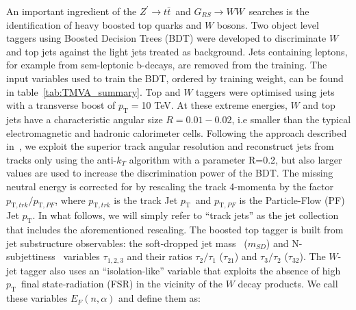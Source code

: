 \documentclass[a4paper,11pt]{article}
\newcommand*{\Zptt}{\ensuremath{Z^{\prime} \rightarrow \ttbar}}
\newcommand{\ptSub}[1]{\ensuremath{p_{\text{T} #1}}}
\newcommand{\ptSup}[1]{\ensuremath{p_{\text{T}}^{#1}}}
\newcommand{\pt}{\ensuremath{p_{\text{T}}}}
\newcommand{\mSD}{\ensuremath{m_{\ensuremath{SD}}}}
\newcommand*{\rsg}{\ensuremath{G_{RS} \rightarrow WW}}
\newcommand*{\ttbar}{\ensuremath{t\bar{t}}}
\begin{document}
An important ingredient of the \Zptt\ and \rsg\ searches is the identification of heavy boosted top quarks and $W$ bosons. Two object level taggers using Boosted Decision Trees (BDT) were developed to discriminate $W$ and top jets against the light jets treated as background. Jets containing leptons, for example from sem-leptonic b-decays, are removed from the training.
The input variables used to train the BDT, ordered by training weight, can be found in table~\ref{tab:TMVA_summary}.
Top and $W$ taggers were optimised using jets with a transverse boost of $\pt=$10 TeV. At these extreme energies, $W$ and top jets have a characteristic angular size $R=0.01-0.02$, i.e smaller than the typical electromagnetic and hadronic calorimeter cells. Following the approach described in~\cite{Larkoski:2015yqa}, we exploit the superior track angular resolution and reconstruct jets from tracks only using the anti-$k_T$ algorithm with a parameter R=0.2, but also larger values are used to increase the discrimination power of the BDT. The missing neutral energy is corrected for by rescaling the track 4-momenta by the factor $\ptSub{,trk}/\ptSub{,PF}$, where $\ptSub{,trk}$ is the track Jet \pt\ and $\ptSub{,PF}$ is the Particle-Flow (PF) Jet \pt. In what follows, we will simply refer to ``track jets'' as the jet collection that includes the aforementioned rescaling.
\newline
The boosted top tagger is built from jet substructure observables: the soft-dropped jet mass~\cite{Larkoski:2014wba} (\mSD) and N-subjettiness~\cite{Thaler:2010tr} variables $\tau_{1,2,3}$ and their ratios $\tau_{2}/\tau_{1}$ ($\tau_{21}$) and $\tau_{3}/\tau_{2}$ ($\tau_{32}$). The $W$-jet tagger also uses an ``isolation-like'' variable that exploits the absence of high \pt\ final state-radiation (FSR) in the vicinity of the $W$ decay products. We call these variables $E_{F}(n,\alpha)$ and define them as:

\end{document}
